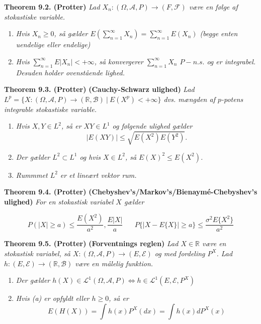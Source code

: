 \documentclass[
]{book}
\providecommand{\tightlist}{%
  \setlength{\itemsep}{0pt}\setlength{\parskip}{0pt}}
\begin{document}
\textbf{Theorem 9.2. (Protter)} \emph{Lad \(X_n : (\Omega,\mathcal{A},P)\to(F,\mathcal{F})\) være en følge af stokastiske variable.}

\begin{enumerate}
\def\labelenumi{\alph{enumi}.}
\tightlist
\item
  \emph{Hvis \(X_n\ge0\), så gælder \(E\left(\sum_{n=1}^\infty X_n\right)=\sum_{n=1}^\infty E(X_n)\) (begge enten uendelige eller endelige)}
\item
  \emph{Hvis \(\sum_{n=1}^\infty E\vert X_n\vert <+\infty\), så konvergerer \(\sum_{n=1}^\infty X_n\) \(P-n.s.\) og er integrabel. Desuden holder ovenstående lighed.}
\end{enumerate}

\textbf{Theorem 9.3. (Protter)} \textbf{(Cauchy-Schwarz ulighed)} \emph{Lad \(L^p=\{X : (\Omega,\mathcal{A},P)\to(\mathbb{R},\mathcal{B})\ \vert\ E(X^p)< +\infty\}\) dvs. mængden af \(p\)-potens integrable stokastiske variable.}

\begin{enumerate}
\def\labelenumi{\alph{enumi}.}
\tightlist
\item
  \emph{Hvis \(X,Y\in L^2\), så er \(XY\in L^1\) og følgende ulighed gælder}
  \[
    \vert E(XY)\vert \le \sqrt{E(X^2)E(Y^2)}.
    \]
\item
  \emph{Der gælder \(L^2\subset L^1\) og hvis \(X\in L^2\), så \(E(X)^2\le E(X^2)\).}
\item
  \emph{Rummmet \(L^2\) er et lineært vektor rum.}
\end{enumerate}

\textbf{Theorem 9.4. (Protter)} \textbf{(Chebyshev's/Markov's/Bienaymé-Chebyshev's ulighed)} \emph{For en stokastisk variabel \(X\) gælder}

\[
P(\vert X\vert \ge a)\le \frac{E(X^2)}{a^2},\frac{E\vert X\vert}{a} \hspace{20pt} P\{\vert X-E\{X\}\vert\ge a\}\le \frac{\sigma^2 E\{X^2\}}{a^2}
\]

\textbf{Theorem 9.5. (Protter)} \textbf{(Forventnings reglen)} \emph{Lad \(X\in \mathbb{R}\) være en stokastisk variabel, så \(X : (\Omega, \mathcal{A}, P)\to (E,\mathcal{E})\) og med fordeling \(P^X\). Lad \(h : (E,\mathcal{E})\to(\mathbb{R},\mathcal{B})\) være en målelig funktion.}

\begin{enumerate}
\def\labelenumi{\alph{enumi}.}
\tightlist
\item
  \emph{Der gælder \(h(X)\in\mathcal{L}^1(\Omega, \mathcal{A}, P)\iff h\in\mathcal{L}^1(E, \mathcal{E}, P^X)\)}
\item
  \emph{Hvis (a) er opfyldt eller \(h\ge 0\), så er}
  \[
    E(H(X))=\int h(x)P^X(dx)=\int h(x)dP^X(x)
    \]
\end{enumerate}
\end{document}
